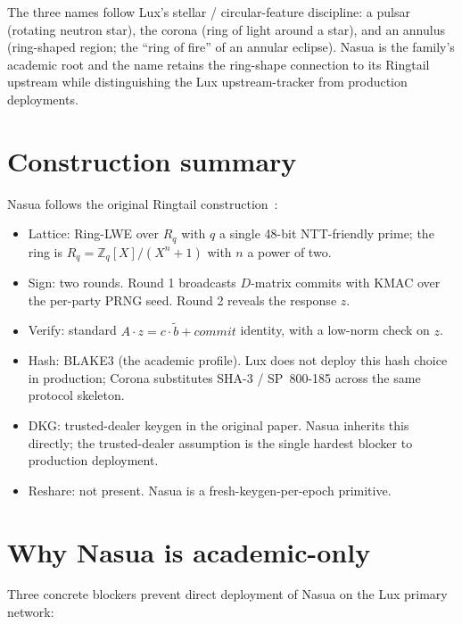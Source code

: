 \documentclass[11pt,a4paper]{article}
\theoremstyle{definition}
\theoremstyle{remark}
\newcommand{\Rq}{R_q}
\newcommand{\Zq}{\mathbb{Z}_q}
\begin{document}
The three names follow Lux's stellar / circular-feature
discipline: a pulsar (rotating neutron star), the corona (ring of
light around a star), and an annulus (ring-shaped region; the
``ring of fire'' of an annular eclipse). Nasua is the family's
academic root and the name retains the ring-shape connection to
its Ringtail upstream while distinguishing the Lux upstream-tracker
from production deployments.

\section{Construction summary}
\label{sec:construction}

Nasua follows the original Ringtail construction~\cite{boschini2024ringtail}:

\begin{itemize}[leftmargin=*, itemsep=0pt]
\item Lattice: Ring-LWE over $\Rq$ with $q$ a single 48-bit
NTT-friendly prime; the ring is $\Rq = \Zq[X] / (X^n + 1)$ with $n$
a power of two.
\item Sign: two rounds. Round 1 broadcasts $D$-matrix commits with
KMAC over the per-party PRNG seed. Round 2 reveals the response
$z$.
\item Verify: standard $A \cdot z = c \cdot \tilde b + \mathit{commit}$
identity, with a low-norm check on $z$.
\item Hash: BLAKE3 (the academic profile). Lux does not deploy this
hash choice in production; Corona substitutes SHA-3 / SP~800-185
across the same protocol skeleton.
\item DKG: trusted-dealer keygen in the original paper. Nasua
inherits this directly; the trusted-dealer assumption is the
single hardest blocker to production deployment.
\item Reshare: not present. Nasua is a fresh-keygen-per-epoch
primitive.
\end{itemize}

\section{Why Nasua is academic-only}
\label{sec:academic-only}

Three concrete blockers prevent direct deployment of Nasua on the
Lux primary network:
\end{document}
